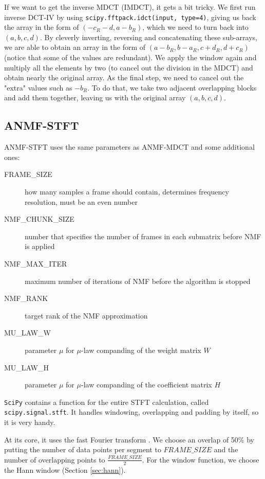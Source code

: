 If we want to get the inverse MDCT (IMDCT), it gets a bit tricky. We first run inverse DCT-IV by using \verb|scipy.fftpack.idct(input, type=4)|, giving us back the array in the form of $(-c_R-d, a-b_R)$, which we need to turn back into $(a, b, c, d)$. By cleverly inverting, reversing and concatenating these sub-arrays, we are able to obtain an array in the form of $(a-b_R, b-a_R, c+d_R, d+c_R)$ (notice that some of the values are redundant). We apply the window again and multiply all the elements by two (to cancel out the division in the MDCT) and obtain nearly the original array. As the final step, we need to cancel out the "extra" values such as $-b_R$. To do that, we take two adjacent overlapping blocks and add them together, leaving us with the original array $(a, b, c, d)$.

\subsection{ANMF-STFT}
ANMF-STFT uses the same parameters as ANMF-MDCT and some additional ones:

\begin{description}
	\item[FRAME\_SIZE] how many samples a frame should contain, determines frequency resolution, must be an even number
	\item[NMF\_CHUNK\_SIZE] number that specifies the number of frames in each submatrix before NMF is applied
	\item[NMF\_MAX\_ITER] maximum number of iterations of NMF before the algorithm is stopped
	\item[NMF\_RANK] target rank of the NMF approximation
	\item[MU\_LAW\_W] parameter $\mu$ for $\mu$-law companding of the weight matrix $W$
	\item[MU\_LAW\_H] parameter $\mu$ for $\mu$-law companding of the coefficient matrix $H$
\end{description}

\verb|SciPy| contains a function for the entire STFT calculation, called \verb|scipy.signal.stft|. It handles windowing, overlapping and padding by itself, so it is very handy.

At its core, it uses the fast Fourier transform \cite{Oppenheim:2009:DSP:1795494}. We choose an overlap of 50\% by putting the number of data points per segment to $FRAME\_SIZE$ and the number of overlapping points to $\frac{FRAME\_SIZE}{2}$. For the window function, we choose the Hann window (Section \ref{sec:hann}).

